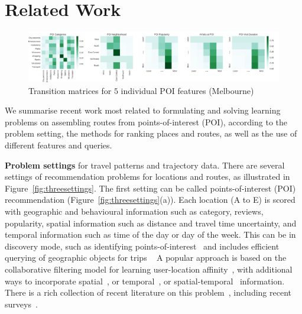 
\section{Related Work}
\label{sec:relatedwork}


\begin{figure}[htbp]
\includegraphics[width=\textwidth]{fig/poi_transmat.png}
\caption{Transition matrices for $5$ individual POI features (Melbourne)}
\label{fig:transmat}
\end{figure}



We summarise recent work most related to formulating and solving learning problems on assembling routes
from points-of-interest (POI), according to the problem setting, the methods for ranking places and routes, as well as the use of different features and queries.

{\bf Problem settings} for travel patterns and trajectory data.
There are several settings of recommendation problems for locations and routes, as illustrated in Figure~\ref{fig:threesettings}.
The first setting can be called points-of-interest (POI) recommendation (Figure~\ref{fig:threesettings}(a)). Each location (A to E) is scored with geographic and behavioural information such as category, reviews, popularity, spatial information such as distance and travel time uncertainty, and temporal information such as time of the day or day of the week.
This can be in discovery mode, such as identifying points-of-interest~\cite{zheng2009mining,li2015instagram} and includes efficient querying of geographic objects for trips ~\cite{hashem2015efficient}
A popular approach is based on the collaborative filtering model
for learning user-location affinity~\cite{shi2011personalized}, with additional ways to incorporate spatial~\cite{lian2014geomf,liu2014exploiting}, or temporal~\cite{yuan2013timeaware,hsieh2014mining,gao2013temporal}, or spatial-temporal~\cite{yuan2014graph} information.
There is a rich collection of recent literature on this problem~\cite{yin2015joint,shi2011personalized,lian2014geomf,liu2014exploiting,yuan2013timeaware,hsieh2014mining,gao2013temporal,yuan2014graph}, including recent surveys~\cite{bao2015recommendations,zheng2014urban}.


